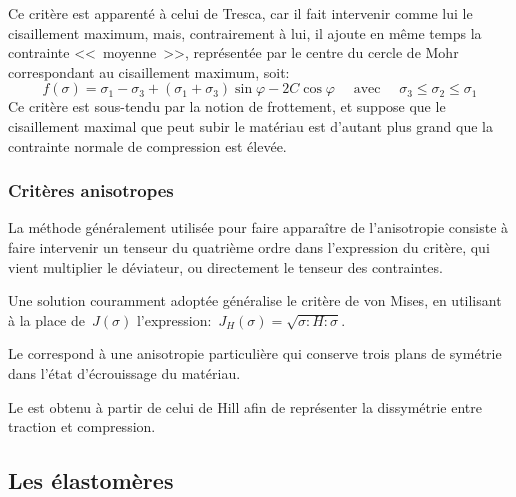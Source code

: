 Ce critère
est apparenté à celui de Tresca,
car il fait intervenir comme lui le cisaillement maximum, mais, contrairement à lui, il ajoute en même temps
la contrainte <<~moyenne~>>, représentée par le centre du cercle de Mohr correspondant au cisaillement
maximum, soit:
\begin{equation} f(\sigma) = \sigma_1 - \sigma_3 + (\sigma_1 + \sigma_3) \sin\varphi - 2C\cos \varphi \quad
\text{ avec } \quad \sigma_3 \le \sigma_2 \le \sigma_1 \end{equation}
Ce critère est sous-tendu par la notion de frottement, et suppose que le cisaillement maximal que peut
subir le matériau est d'autant plus grand que la contrainte normale de compression est élevée.

\medskip
\subsubsection{Critères anisotropes}

La méthode généralement utilisée pour faire apparaître de l'anisotropie consiste à faire intervenir
un tenseur du quatrième ordre dans l'expression du critère, qui vient multiplier le déviateur, ou directement
le tenseur des contraintes.

Une solution couramment adoptée généralise le critère de von Mises, en utilisant à la place de~$J(\sigma)$
l'expression:~$J_H(\sigma) = \sqrt{\sigma: H: \sigma}$.

\medskip
Le 
correspond à une anisotropie particulière qui conserve trois plans de symétrie dans l'état d'écrouissage du
matériau.

\medskip
Le 
est obtenu à partir de celui de Hill afin de représenter la dissymétrie entre traction et compression.







\medskip
\subsection{Les élastomères}

